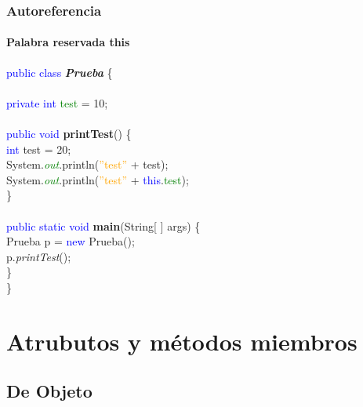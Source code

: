 \documentclass{beamer}
\begin{document}
        \begin{frame}
			\frametitle{Autoreferencia}
			\framesubtitle{Palabra reservada this}

			\begin{block}{}
				{\scriptsize
				\textcolor{blue}{public class} \textbf{\emph{Prueba}} \{ \\
				\hspace{1cm} \\
				\hspace{1cm} \textcolor{blue}{private int} \textcolor{green}{test} = 10; \ \\
				\hspace{1cm} \\
				\hspace{1cm} \textcolor{blue}{public void} \textbf{printTest}() \{ \\
				\hspace{2cm} \textcolor{blue}{int} test = 20;\\
				\hspace{2cm} System.\emph{\textcolor{green}{out}}.println(\textcolor{orange}{''test''} + test);\\
                \hspace{2cm} System.\emph{\textcolor{green}{out}}.println(\textcolor{orange}{''test''} + \textcolor{blue}{this}.\textcolor{green}{test});\\
				\hspace{1cm} \} \\
				\hspace{1cm} \\
				\hspace{1cm} \textcolor{blue}{public static void} \textbf{main}(String[ ] args) \{ \\
				\hspace{2cm} Prueba p = \textcolor{blue}{new} Prueba(); \\
				\hspace{2cm} p.\emph{printTest}();\\
				\hspace{1cm} \} \\
				\}}
			\end{block}
		\end{frame}		

    \section{Atrubutos y m\'etodos miembros}
    
        \subsection{De Objeto}
\end{document}
